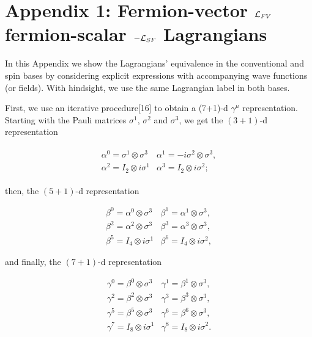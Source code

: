 \documentclass[12pt]{article}
\renewcommand\[{\begin{dmath}}
\renewcommand\]{\end{dmath}}
\begin{document}
\appendix{}
\section*{Appendix 1: Fermion-vector   ${\cal L}_{FV}$ fermion-scalar $-{\cal L}_{SF}$ Lagrangians  }



In this  Appendix we    show  the  Lagrangians'   equivalence    in the conventional and spin  bases by considering  explicit   expressions with accompanying wave functions (or fields).
With hindsight, we use the same   Lagrangian   label in both bases.

First, we use an iterative procedure[16] to obtain a (7+1)-d  $\gamma^\mu$ representation.
Starting with the Pauli matrices $\sigma^{1}$, $\sigma^{2}$ and
$\sigma^{3}$, we get the $(3+1)$-d representation

\begin{eqnarray}
\begin{array}{cl}
\alpha^{0}=\sigma^{1}\otimes\sigma^{3} & \alpha^{1}=-i\sigma^{2}\otimes\sigma^{3},\\
\alpha^{2}=I_{2}\otimes i\sigma^{1} & \alpha^{3}=I_{2}\otimes i\sigma^{2};
\end{array}\label{eq:A1}
\end{eqnarray}

\noindent then, the $(5+1)$-d  representation

\begin{equation}
\begin{array}{ll}
\beta^{0}=\alpha^{0}\otimes\sigma^{3} & \beta^{1}=\alpha^{1}\otimes\sigma^{3},\\
\beta^{2}=\alpha^{2}\otimes\sigma^{3} & \beta^{3}=\alpha^{3}\otimes\sigma^{3},\\
\beta^{5}=I_{4}\otimes i\sigma^{1} & \beta^{6}=I_{4}\otimes i\sigma^{2},
\end{array}\label{eq:A2}
\end{equation}

\noindent and finally, the $(7+1)$-d representation

\begin{equation}
\begin{array}{ll}
\gamma^{0}=\beta^{0}\otimes\sigma^{3} & \gamma^{1}=\beta^{1}\otimes\sigma^{3},\\
\gamma^{2}=\beta^{2}\otimes\sigma^{3} & \gamma^{3}=\beta^{3}\otimes\sigma^{3},\\
\gamma^{5}=\beta^{5}\otimes\sigma^{3} & \gamma^{6}=\beta^{6}\otimes\sigma^{3},\\
\gamma^{7}=I_{8}\otimes i\sigma^{1} & \gamma^{8}=I_{8}\otimes i\sigma^{2}.
\end{array}\label{eq:A3}
\end{equation}
\end{document}

